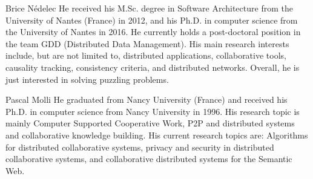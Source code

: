 
\begin{IEEEbiography}
{Brice N{\'e}delec} He received his M.Sc. degree in Software Architecture from
the University of Nantes (France) in 2012, and his Ph.D. in computer science
from the University of Nantes in 2016. He currently holds a post-doctoral
position in the team GDD (Distributed Data Management). His main research
interests include, but are not limited to, distributed applications,
collaborative tools, causality tracking, consistency criteria, and distributed
networks. Overall, he is just interested in solving puzzling problems.
\end{IEEEbiography}

\begin{IEEEbiography}
{Pascal Molli} He graduated from Nancy University (France) and received his
Ph.D. in computer science from Nancy University in 1996.  His research topic is mainly
Computer Supported Cooperative Work, P2P and distributed systems and
collaborative knowledge building. His current research topics are: Algorithms
for distributed collaborative systems, privacy and security in distributed
collaborative systems, and collaborative distributed systems for the Semantic
Web.
\end{IEEEbiography}


